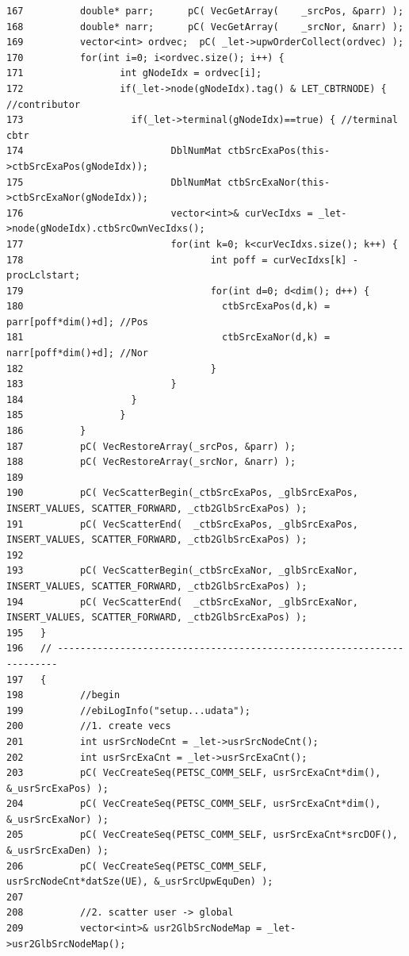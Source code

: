\begin{verbatim}
167          double* parr;      pC( VecGetArray(    _srcPos, &parr) );
168          double* narr;      pC( VecGetArray(    _srcNor, &narr) );
169          vector<int> ordvec;  pC( _let->upwOrderCollect(ordvec) );
170          for(int i=0; i<ordvec.size(); i++) {
171                 int gNodeIdx = ordvec[i];
172                 if(_let->node(gNodeIdx).tag() & LET_CBTRNODE) { //contributor
173                   if(_let->terminal(gNodeIdx)==true) { //terminal cbtr
174                          DblNumMat ctbSrcExaPos(this->ctbSrcExaPos(gNodeIdx));
175                          DblNumMat ctbSrcExaNor(this->ctbSrcExaNor(gNodeIdx));
176                          vector<int>& curVecIdxs = _let->node(gNodeIdx).ctbSrcOwnVecIdxs();
177                          for(int k=0; k<curVecIdxs.size(); k++) {
178                                 int poff = curVecIdxs[k] - procLclstart;
179                                 for(int d=0; d<dim(); d++) {
180                                   ctbSrcExaPos(d,k) = parr[poff*dim()+d]; //Pos
181                                   ctbSrcExaNor(d,k) = narr[poff*dim()+d]; //Nor
182                                 }
183                          }
184                   }
185                 }
186          }
187          pC( VecRestoreArray(_srcPos, &parr) );
188          pC( VecRestoreArray(_srcNor, &narr) );
189          
190          pC( VecScatterBegin(_ctbSrcExaPos, _glbSrcExaPos, INSERT_VALUES, SCATTER_FORWARD, _ctb2GlbSrcExaPos) );
191          pC( VecScatterEnd(  _ctbSrcExaPos, _glbSrcExaPos, INSERT_VALUES, SCATTER_FORWARD, _ctb2GlbSrcExaPos) );
192          
193          pC( VecScatterBegin(_ctbSrcExaNor, _glbSrcExaNor, INSERT_VALUES, SCATTER_FORWARD, _ctb2GlbSrcExaPos) );
194          pC( VecScatterEnd(  _ctbSrcExaNor, _glbSrcExaNor, INSERT_VALUES, SCATTER_FORWARD, _ctb2GlbSrcExaPos) );
195   }
196   // ---------------------------------------------------------------------- 
197   {
198          //begin
199          //ebiLogInfo("setup...udata");
200          //1. create vecs
201          int usrSrcNodeCnt = _let->usrSrcNodeCnt();
202          int usrSrcExaCnt = _let->usrSrcExaCnt();
203          pC( VecCreateSeq(PETSC_COMM_SELF, usrSrcExaCnt*dim(),  &_usrSrcExaPos) );
204          pC( VecCreateSeq(PETSC_COMM_SELF, usrSrcExaCnt*dim(),  &_usrSrcExaNor) );
205          pC( VecCreateSeq(PETSC_COMM_SELF, usrSrcExaCnt*srcDOF(), &_usrSrcExaDen) );
206          pC( VecCreateSeq(PETSC_COMM_SELF, usrSrcNodeCnt*datSze(UE), &_usrSrcUpwEquDen) );
207          
208          //2. scatter user -> global
209          vector<int>& usr2GlbSrcNodeMap = _let->usr2GlbSrcNodeMap();

\end{verbatim}
